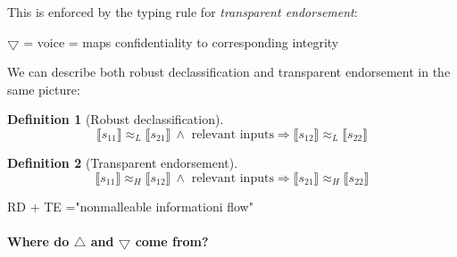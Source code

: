 \documentclass{article}
\newtheorem{definition}{Definition}[theorem]
\begin{document}
This is enforced by the typing  rule for \emph{transparent endorsement}:

\begin{prooftree}
\end{prooftree}

$\bigtriangledown$ = voice = maps confidentiality to corresponding integrity

We can describe both robust declassification and transparent endorsement in the same picture:



\begin{definition}[Robust declassification]  
\begin{equation*}
  \llbracket s_{11} \rrbracket \approx_L \llbracket s_{21} \rrbracket \ \land \text{ relevant inputs} \Rightarrow \llbracket s_{12} \rrbracket \approx_L \llbracket s_{22} \rrbracket 
\end{equation*}
\end{definition}


\begin{definition}[Transparent endorsement]
\begin{equation*}
  \llbracket s_{11} \rrbracket \approx_H \llbracket s_{12} \rrbracket \ \land \text{ relevant inputs} \Rightarrow \llbracket s_{21} \rrbracket \approx_H \llbracket s_{22} \rrbracket
\end{equation*}  
\end{definition}  

RD + TE ="nonmalleable informationi flow"

\paragraph{Where do $\bigtriangleup$ and $\bigtriangledown$ come from?}\ 
\end{document}

